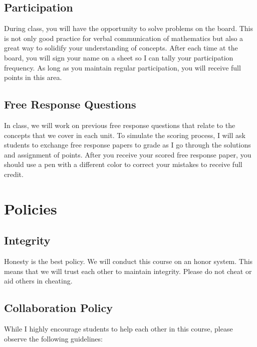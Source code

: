 \documentclass[12pt,fleqn]{article}
\begin{document}
\hypertarget{participation}{%
\subsection{Participation}\label{participation}}

During class, you will have the opportunity to solve problems on the board. This is not only good practice for verbal communication of mathematics but also a great way to solidify your understanding of concepts. After each time at the board, you will sign your name on a sheet so I can tally your participation frequency. As long as you maintain regular participation, you will receive full points in this area.

\hypertarget{free-response-questions}{%
\subsection{Free Response Questions}\label{free-response-questions}}

In class, we will work on previous free response questions that relate to the concepts that we cover in each unit. To simulate the scoring process, I will ask students to exchange free response papers to grade as I go through the solutions and assignment of points. After you receive your scored free response paper, you should use a pen with a different color to correct your mistakes to receive full credit.

\hypertarget{policies}{%
\section{Policies}\label{policies}}

\hypertarget{integrity}{%
\subsection{Integrity}\label{integrity}}

Honesty is the best policy. We will conduct this course on an honor system. This means that we will trust each other to maintain integrity. Please do not cheat or aid others in cheating.

\hypertarget{collaboration-policy}{%
\subsection{Collaboration Policy}\label{collaboration-policy}}

While I highly encourage students to help each other in this course, please observe the following guidelines:
\end{document}
